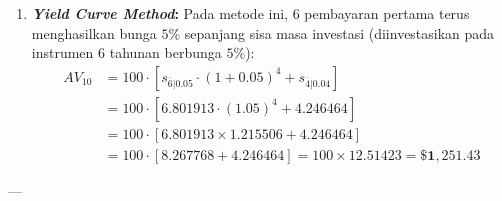 \documentclass[11pt,a4paper]{article}
\begin{document}
\begin{examplebox}
\begin{enumerate}[label=(\alph*)]
    \item \textbf{\textit{Yield Curve Method}:}
    Pada metode ini, 6 pembayaran pertama terus menghasilkan bunga $5\%$ sepanjang sisa masa investasi (diinvestasikan pada instrumen 6 tahunan berbunga $5\%$):
    \begin{align*}
        AV_{10} &= 100 \cdot \left[ s_{\overline{6}|0.05} \cdot (1 + 0.05)^4 + s_{\overline{4}|0.04} \right] \\[0.4em]
                &= 100 \cdot \left[ 6.801913 \cdot (1.05)^4 + 4.246464 \right] \\[0.4em]
                &= 100 \cdot \left[ 6.801913 \times 1.215506 + 4.246464 \right] \\[0.4em]
                &= 100 \cdot \left[ 8.267768 + 4.246464 \right] = 100 \times 12.51423 = \mathbf{\$1{,}251.43}
    \end{align*}
\end{enumerate}
\end{examplebox}

---
\end{document}

